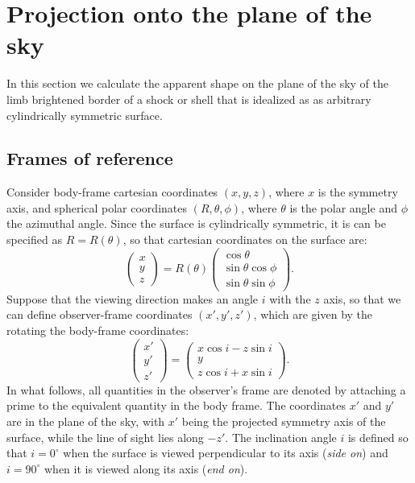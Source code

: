 \section{Projection onto the plane of the sky}
\label{sec:projection}

In this section we calculate the apparent shape on the plane of the
sky of the limb brightened border of a shock or shell that is
idealized as as arbitrary cylindrically symmetric surface.

\subsection{Frames of reference}


Consider body-frame cartesian coordinates $(x,y,z)$, where \(x\) is
the symmetry axis, and spherical polar coordinates
\((R, \theta, \phi)\), where \(\theta\) is the polar angle and
\(\phi\) the azimuthal angle.  Since the surface is cylindrically
symmetric, it is can be specified as $R = R(\theta)$, so that
cartesian coordinates on the surface are:
\begin{equation}
\left(\begin{array}{c}
x \\ y \\ z
\end{array}
\right) = R(\theta)\left(\begin{array}{c}
\cos\theta \\
\sin\theta\cos\phi \\
\sin\theta\sin\phi
\end{array}\right).
\end{equation} 
Suppose that the viewing direction makes an angle \(i\) with the \(z\)
axis, so that we can define observer-frame coordinates
\((x', y', z')\), which are given by the rotating the body-frame
coordinates:
\begin{equation}
\left(\begin{array}{c}
x' \\ y' \\ z'
\end{array}
\right) = \left(\begin{array}{c}
x\cos i - z\sin i\\
y \\
z\cos i + x\sin i
\end{array}\right).
\label{eq:Trans}
\end{equation} 
In what follows, all quantities in the observer's frame are denoted by
attaching a prime to the equivalent quantity in the body frame.  The
coordinates \(x'\) and \(y'\) are in the plane of the sky, with \(x'\)
being the projected symmetry axis of the surface, while the line of
sight lies along \(-z'\).  The inclination angle \(i\) is defined so
that \(i = 0^\circ\) when the surface is viewed perpendicular to its
axis (\textit{side on}) and \(i = 90^\circ\) when it is viewed along
its axis (\textit{end on}).


